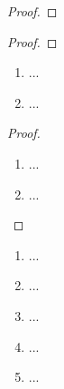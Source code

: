\documentclass[12pt]{scrreprt}
\begin{document}
\begin{kor}\label{}

\end{kor}

\begin{satz}\label{}

\end{satz}
\begin{proof}

\end{proof}

\begin{satz}\label{}

\end{satz}
\begin{bem*}

\end{bem*}
\begin{proof}

\end{proof}

\begin{bsp}\label{}
\begin{enumerate}
\item ...
\item ...
\end{enumerate}
\end{bsp}

\begin{thm}\label{}

\end{thm}
\begin{proof}
\begin{enumerate}
\item ...
\item ...
\end{enumerate}
\end{proof}

\begin{bsp}\label{}
\begin{enumerate}
\item ...
\item ...
\item ...
\item ...
\item ...
\end{enumerate}
\end{bsp}

\begin{bsp}\label{}

\end{bsp}
\end{document}
